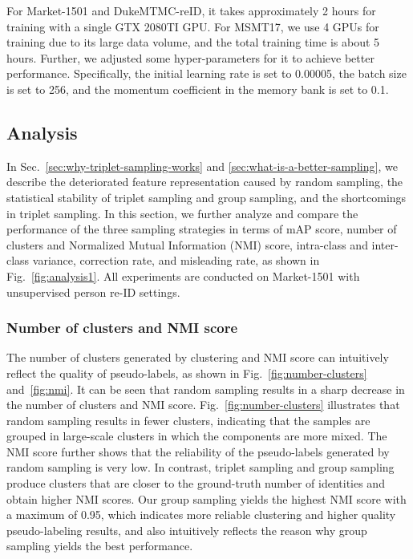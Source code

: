 \documentclass[lettersize,journal]{IEEEtran}
\begin{document}
For Market-1501 and DukeMTMC-reID, it takes approximately 2 hours for training with a single GTX 2080TI GPU. 
For MSMT17, we use 4 GPUs for training due to its large data volume, and the total training time is about 5 hours. Further, we adjusted some hyper-parameters for it to achieve better performance. Specifically, the initial learning rate is set to 0.00005, the batch size is set to 256, and the momentum coefficient in the memory bank is set to 0.1.

\subsection{Analysis} \label{sec:analysis}
In Sec.~\ref{sec:why-triplet-sampling-works} and \ref{sec:what-is-a-better-sampling}, we describe the deteriorated feature representation caused by random sampling, the statistical stability of triplet sampling and group sampling, and the shortcomings in triplet sampling.
In this section, we further analyze and compare the performance of the three sampling strategies in terms of mAP score, number of clusters and Normalized Mutual Information (NMI) score, intra-class and inter-class variance, correction rate, and misleading rate, as shown in Fig.~\ref{fig:analysis1}.
All experiments are conducted on Market-1501 with unsupervised person re-ID settings. 


\subsubsection{Number of clusters and NMI score} \label{sec:number-nmi}
The number of clusters generated by clustering and NMI score can intuitively reflect the quality of pseudo-labels, as shown in Fig.~\ref{fig:number-clusters} and~\ref{fig:nmi}. It can be seen that random sampling results in a sharp decrease in the number of clusters and NMI score. Fig.~\ref{fig:number-clusters} illustrates that random sampling results in fewer clusters, indicating that the samples are grouped in large-scale clusters in which the components are more mixed. The NMI score further shows that the reliability of the pseudo-labels generated by random sampling is very low.
In contrast, triplet sampling and group sampling produce clusters that are closer to the ground-truth number of identities and obtain higher NMI scores. Our group sampling yields the highest NMI score with a maximum of 0.95, which indicates more reliable clustering and higher quality pseudo-labeling results, and also intuitively reflects the reason why group sampling yields the best performance.
\end{document}

